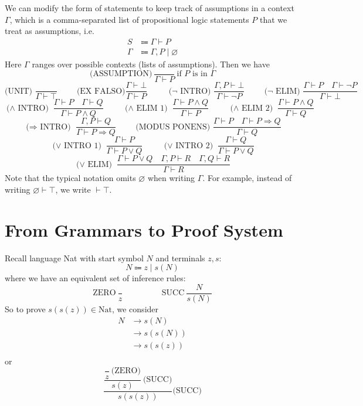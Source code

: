 We can modify the form of statements to keep track of assumptions in a context \(\Gamma\), which is a comma-separated list of propositional logic statements \(P\) that we treat as assumptions, i.e.
\[
\begin{aligned}
  S &\Coloneqq \Gamma \vdash P \\
  \Gamma &\Coloneqq \Gamma, P \mid \varnothing
\end{aligned}
\]
Here \(\Gamma\) ranges over possible contexts (lists of assumptions). Then we have
\[
  \text{(ASSUMPTION)}\ \dfrac{}{\Gamma \vdash P}\ \text{if } P \text{ is in } \Gamma 
\]
\[
\text{(UNIT) } \dfrac{}{\Gamma \vdash \top} \hspace{1cm} \text{(EX FALSO)} \dfrac{\Gamma \vdash \bot}{\Gamma \vdash P}\ \hspace{1cm} \text{(\(\neg\) INTRO) } \dfrac{\Gamma, P \vdash \bot}{\Gamma \vdash \neg P} \hspace{1cm} \text{(\(\neg\) ELIM) } \dfrac{\Gamma \vdash P \quad \Gamma \vdash \neg P}{\Gamma \vdash \bot}  
\]
\[
  \text{(\(\wedge\) INTRO) } \dfrac{\Gamma \vdash P \quad \Gamma \vdash Q}{\Gamma \vdash P \wedge Q} \hspace{1cm} \text{(\(\wedge\) ELIM 1) } \dfrac{\Gamma \vdash P \wedge Q}{\Gamma \vdash P} \hspace{1cm} \text{(\(\wedge\) ELIM 2) } \dfrac{\Gamma \vdash P \wedge Q}{\Gamma \vdash Q}
\]
\[
  \text{(\(\Rightarrow\) INTRO) } \dfrac{\Gamma, P \vdash Q}{\Gamma \vdash P \Rightarrow Q} \hspace{1cm} \text{(MODUS PONENS) } \dfrac{\Gamma \vdash P \quad \Gamma \vdash P \Rightarrow Q}{\Gamma \vdash Q}
\]
\[
  \text{(\(\vee\) INTRO 1) } \dfrac{\Gamma \vdash P}{\Gamma \vdash P \vee Q} \hspace{1cm} \text{(\(\vee\) INTRO 2) } \dfrac{\Gamma \vdash Q}{\Gamma \vdash P \vee Q}
\]
\[
  \text{(\(\vee\) ELIM) } \dfrac{\Gamma \vdash P \vee Q \quad \Gamma, P \vdash R \quad \Gamma, Q \vdash R}{\Gamma \vdash R}
\]
Note that the typical notation omits \(\varnothing\) when writing \(\Gamma\). For example, instead of writing \(\varnothing \vdash \top\), we write \(\vdash \top\).

\section{From Grammars to Proof System}
Recall language Nat with start symbol \(N\) and terminals \(z, s\):
\[
  N \Coloneqq z \mid s(N)
\]
where we have an equivalent set of inference rules:
\[
  \text{ZERO}\ \dfrac{}{z} \hspace{2cm} \text{SUCC}\ \dfrac{N}{s(N)}
\]
So to prove \(s(s(z)) \in \text{Nat}\), we consider 
\[
  \begin{aligned}
    N &\to s(N) \\
    &\to s(s(N)) \\
    &\to s(s(z)) \\
  \end{aligned}
\]
or
\[
  \dfrac{\dfrac{\dfrac{}{z}\ \text{(ZERO)}}{s(z)}\ \text{(SUCC)}}{s(s(z))} \text{(SUCC)}
\]

